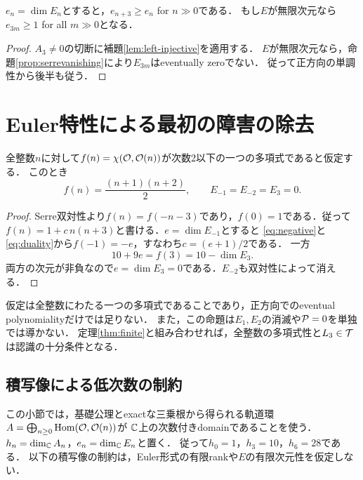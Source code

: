 \documentclass[11pt,a4paper]{ltjsarticle}
\begin{document}
\begin{corollary}\label{cor:eventual-ext-monotone}
$e_n=\dim E_n$とすると，$e_{n+3}\geq e_n$ for $n\gg0$である．
もし$E$が無限次元なら$e_{3m}\geq1$ for all $m\gg0$となる．
\end{corollary}
\begin{proof}
$A_3\ne0$の切断に補題\ref{lem:left-injective}を適用する．
$E$が無限次元なら，命題\ref{prop:serrevanishing}により$E_{3m}$はeventually zeroでない．
従って正方向の単調性から後半も従う．
\end{proof}

\section{Euler特性による最初の障害の除去}\label{sec:euler}
\begin{proposition}[全整数の多項式性による判定]\label{prop:polynomial}
全整数$n$に対して$f(n)=\chi(\mathcal O,\mathcal O(n))$が次数2以下の一つの多項式であると仮定する．
このとき
\[
 f(n)=\frac{(n+1)(n+2)}2,\qquad E_{-1}=E_{-2}=E_3=0.
\]
\end{proposition}
\begin{proof}
Serre双対性より$f(n)=f(-n-3)$であり，$f(0)=1$である．従って
$f(n)=1+c\,n(n+3)$と書ける．$e=\dim E_{-1}$とすると
\eqref{eq:negative}と\eqref{eq:duality}から$f(-1)=-e$，すなわち$c=(e+1)/2$である．
一方
\[
 10+9e=f(3)=10-\dim E_3.
\]
両方の次元が非負なので$e=\dim E_3=0$である．$E_{-2}$も双対性によって消える．
\end{proof}

仮定は全整数にわたる一つの多項式であることであり，正方向でのeventual polynomialityだけでは足りない．
また，この命題は$E_1,E_2$の消滅や$\mathcal P=0$を単独では導かない．
定理\ref{thm:finite}と組み合わせれば，全整数の多項式性と$L_3\in\mathcal T$は認識の十分条件となる．


\subsection{積写像による低次数の制約}
この小節では，基礎公理とexactな三乗根から得られる軌道環
$A=\bigoplus_{n\geq0}\operatorname{Hom}(\mathcal O,\mathcal O(n))$が
$\mathbb C$上の次数付きdomainであることを使う．
$h_n=\dim_\mathbb C A_n$，$e_n=\dim_\mathbb C E_n$と置く．
従って$h_0=1$，$h_3=10$，$h_6=28$である．
以下の積写像の制約は，Euler形式の有限rankや$E$の有限次元性を仮定しない．
\end{document}
